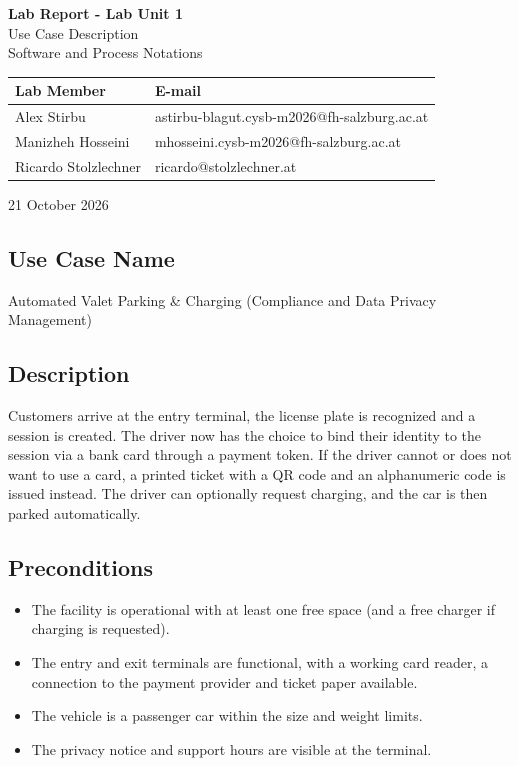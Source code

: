 \documentclass[11pt,a4paper]{article}
\makeatletter
\newcommand{\course}{Software and Process Notations}
\newcommand{\labno}{1}
\newcommand{\labtopic}{Use Case Description}
\newcommand{\reportdate}{21 October 2026}
\newcommand{\members}{%
    \member{Alex Stirbu}{astirbu-blagut.cysb-m2026@fh-salzburg.ac.at}    
    \member{Manizheh Hosseini}{mhosseini.cysb-m2026@fh-salzburg.ac.at}
    \member{Ricardo Stolzlechner}{ricardo@stolzlechner.at}
}
\newcommand{\member}[2]{#1 & #2 \\}
\makeatother
\begin{document}
\begin{titlepage}
    \centering
    \vspace*{4cm}
    {\LARGE \textbf{Lab Report - Lab Unit \labno}}\\[0.5em]
    {\Large \labtopic}\\[0.5em]
    {\large \course}

    \vspace{3cm}

    \begin{tabular}{l l}
        \toprule
        \textbf{Lab Member} & \textbf{E-mail} \\
        \midrule
        \members
        \bottomrule
    \end{tabular}

    \vfill
    {\large \reportdate}
\end{titlepage}

\subsection*{Use Case Name}

Automated Valet Parking \& Charging (Compliance and Data Privacy
Management)

\subsection*{Description}

Customers arrive at the entry terminal, the license plate is recognized and
a session is created. The driver now has the choice to bind their identity
to the session via a bank card through a payment token. If the driver
cannot or does not want to use a card, a printed ticket with a QR code
and an alphanumeric code is issued instead. The driver can optionally
request charging, and the car is then parked automatically.

\subsection*{Preconditions}

\begin{itemize}
    \item The facility is operational with at least one free space (and a free
charger if charging is requested).
\item The entry and exit terminals are functional, with a working card reader,
a connection to the payment provider and ticket paper available.
\item The vehicle is a passenger car within the size and weight limits.
\item The privacy notice and support hours are visible at the terminal.
\end{itemize}
\end{document}
